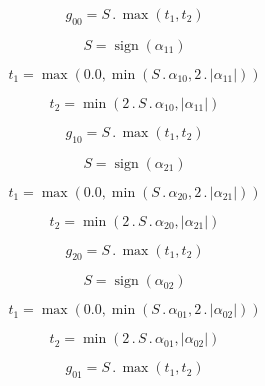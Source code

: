 \documentclass{article}
\begin{document}
\begin{dmath}g_{00} = S \,.\, \max\left(t_{1}, t_{2}\right)\end{dmath}

\begin{dmath}S = \operatorname{sign}{\left (\alpha_{11} \right )}\end{dmath}

\begin{dmath}t_{1} = \max\left(0.0, \min\left(S \,.\, \alpha_{10}, 2 \,.\, \left|{\alpha_{11}}\right|\right)\right)\end{dmath}

\begin{dmath}t_{2} = \min\left(2 \,.\, S \,.\, \alpha_{10}, \left|{\alpha_{11}}\right|\right)\end{dmath}

\begin{dmath}g_{10} = S \,.\, \max\left(t_{1}, t_{2}\right)\end{dmath}

\begin{dmath}S = \operatorname{sign}{\left (\alpha_{21} \right )}\end{dmath}

\begin{dmath}t_{1} = \max\left(0.0, \min\left(S \,.\, \alpha_{20}, 2 \,.\, \left|{\alpha_{21}}\right|\right)\right)\end{dmath}

\begin{dmath}t_{2} = \min\left(2 \,.\, S \,.\, \alpha_{20}, \left|{\alpha_{21}}\right|\right)\end{dmath}

\begin{dmath}g_{20} = S \,.\, \max\left(t_{1}, t_{2}\right)\end{dmath}

\begin{dmath}S = \operatorname{sign}{\left (\alpha_{02} \right )}\end{dmath}

\begin{dmath}t_{1} = \max\left(0.0, \min\left(S \,.\, \alpha_{01}, 2 \,.\, \left|{\alpha_{02}}\right|\right)\right)\end{dmath}

\begin{dmath}t_{2} = \min\left(2 \,.\, S \,.\, \alpha_{01}, \left|{\alpha_{02}}\right|\right)\end{dmath}

\begin{dmath}g_{01} = S \,.\, \max\left(t_{1}, t_{2}\right)\end{dmath}
\end{document}
